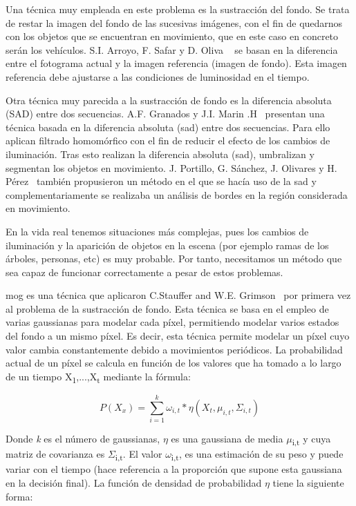Una técnica muy empleada en este problema es la sustracción del fondo. Se trata de restar la imagen del fondo de las sucesivas imágenes, con el fin de quedarnos con los objetos que se encuentran en movimiento, que en este caso en concreto serán los vehículos. S.I. Arroyo, F. Safar y D. Oliva ~\cite{probabilidad_infraccion}
 se basan en la diferencia entre el fotograma actual y la imagen referencia (imagen de fondo). Esta imagen referencia debe ajustarse a las condiciones de luminosidad en el tiempo.
 
 Otra técnica muy parecida a la sustracción de fondo es la diferencia absoluta (SAD) entre dos secuencias. A.F. Granados y J.I. Marin .H~\cite{deteccion_flujo_vehicular} presentan una técnica basada  en la diferencia absoluta (\acrfull{sad}) entre dos secuencias. Para ello aplican filtrado homomórfico con el fin de reducir el efecto de los cambios de iluminación. Tras esto realizan la diferencia absoluta (\acrshort{sad}), umbralizan y segmentan los objetos en movimiento. J. Portillo, G. Sánchez, J. Olivares y H. Pérez~\cite{deteccion_movimiento} también propusieron un método en el que se hacía uso de la \acrshort{sad} y complementariamente se realizaba un análisis de bordes en la región considerada en movimiento.

En la vida real tenemos situaciones más complejas, pues los cambios de iluminación y la aparición de objetos en la escena (por ejemplo ramas de los árboles, personas, etc) es muy probable. Por tanto, necesitamos un método que sea capaz de funcionar correctamente a pesar de estos problemas.

\acrfull{mog} es una técnica que aplicaron C.Stauffer and  W.E.  Grimson~\cite{adaptative_background} por primera vez al problema de la sustracción de fondo. Esta técnica se basa en el empleo de varias gaussianas para modelar cada píxel, permitiendo modelar varios estados del fondo a un mismo píxel. Es decir, esta técnica permite modelar un píxel cuyo valor cambia constantemente debido a movimientos periódicos.  La probabilidad actual de un píxel se calcula en función de los valores que ha tomado a lo largo de un tiempo X\textsubscript{1},...,X\textsubscript{t} mediante la fórmula:

\begin{equation}\label{gmm_formula}
P(X_{x}) = \sum_{i=1}^{k}\omega_{i,t}*\eta(X_{t},\mu_{i,t},\Sigma_{i,t}) 
\end{equation}

Donde \textit{k} es el número de gaussianas, $\eta$ es  una  gaussiana  de  media $\mu$\textsubscript{i,t} y cuya matriz de covarianza es $\Sigma$\textsubscript{i,t}. El valor $\omega$\textsubscript{i,t}, es una estimación de su peso y puede variar con el tiempo (hace referencia a la proporción que supone esta gaussiana en la decisión final). La función de densidad de probabilidad $\eta$ tiene la siguiente forma:

